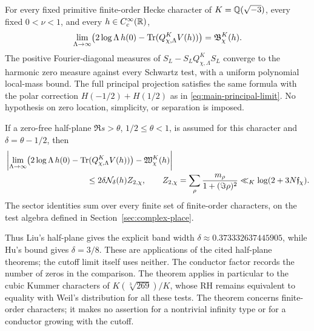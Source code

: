 \begin{theorem}
\label{thm:main-hecke}
For every fixed primitive finite-order Hecke character of
$K=\mathbb Q(\sqrt{-3})$, every fixed $0<\nu<1$, and every
$h\in C_c^\infty(\mathbb R)$,
\[
 \lim_{\Lambda\to\infty}
 \bigl(2\log\Lambda\,h(0)-\operatorname{Tr}(Q^K_{\chi,\Lambda}V(h))\bigr)
                       =\mathfrak B^K_\chi(h).
\]
The positive Fourier-diagonal measures of
$S_L-S_LQ^K_{\chi,\Lambda}S_L$ converge to the harmonic zero measure
against every Schwartz test, with a uniform polynomial local-mass bound.
The full principal projection satisfies the same formula with the polar
correction $H(-1/2)+H(1/2)$ as in
\eqref{eq:main-principal-limit}. No hypothesis on zero location,
simplicity, or separation is imposed.

If a zero-free half-plane $\Re s>\theta$, $1/2\leq\theta<1$, is
assumed for this character and $\delta=\theta-1/2$, then
\begin{align*}
 &\left|\lim_{\Lambda\to\infty}
   \bigl(2\log\Lambda\,h(0)-\Tr(Q^K_{\chi,\Lambda}V(h))\bigr)
                  -\mathfrak W^K_\chi(h)\right|\\
 &\hspace{35mm}\leq2\delta\mathcal N_\delta(h)Z_{2,\chi},
 \qquad
 Z_{2,\chi}=\sum_\rho\frac{m_\rho}{1+(\Im\rho)^2}
                      \ll_K\log(2+3N\mathfrak f_\chi).
\end{align*}
The sector identities sum over every finite set of finite-order
characters, on the test algebra defined in
Section~\ref{sec:complex-place}.
\end{theorem}

Thus Liu's half-plane gives the explicit band width
$\delta\approx0.373332637445905$, while Hu's bound gives
$\delta=3/8$. These are applications of the cited half-plane theorems;
the cutoff limit itself uses neither. The conductor factor records the
number of zeros in the comparison. The theorem applies in particular
to the cubic Kummer characters of $K(\sqrt[3]{269})/K$, whose RH remains
equivalent to equality with Weil's distribution for all these tests.
The theorem concerns finite-order characters; it makes no assertion
for a nontrivial infinity type or for a conductor growing with the cutoff.

